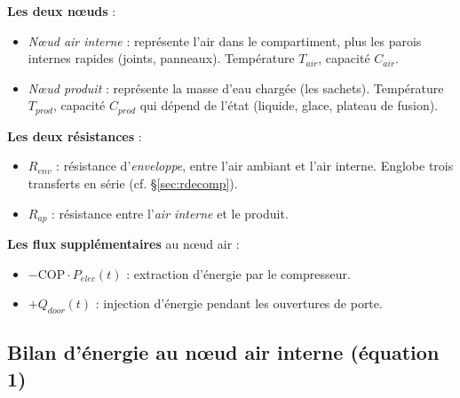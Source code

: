 \documentclass[11pt,a4paper]{article}
\begin{document}
\textbf{Les deux nœuds} :
\begin{itemize}[itemsep=2pt]
\item \emph{Nœud air interne} : représente l'air dans le compartiment, plus les parois
internes rapides (joints, panneaux). Température $T_{air}$, capacité $C_{air}$.
\item \emph{Nœud produit} : représente la masse d'eau chargée (les sachets). Température
$T_{prod}$, capacité $C_{prod}$ qui dépend de l'état (liquide, glace, plateau de fusion).
\end{itemize}

\textbf{Les deux résistances} :
\begin{itemize}[itemsep=2pt]
\item $R_{env}$ : résistance d'\emph{enveloppe}, entre l'air ambiant et l'air interne.
Englobe trois transferts en série (cf. \S\ref{sec:rdecomp}).
\item $R_{ap}$ : résistance entre l'\emph{air interne} et le produit.
\end{itemize}

\textbf{Les flux supplémentaires} au nœud air :
\begin{itemize}[itemsep=2pt]
\item $-\mathrm{COP}\cdot P_{elec}(t)$ : extraction d'énergie par le compresseur.
\item $+Q_{door}(t)$ : injection d'énergie pendant les ouvertures de porte.
\end{itemize}

\subsection{Bilan d'énergie au nœud air interne (équation 1)}
\end{document}
